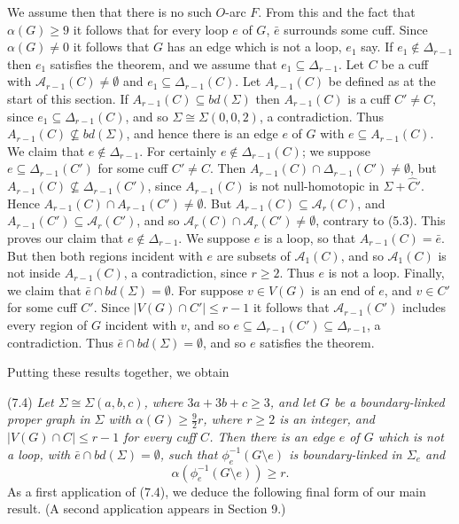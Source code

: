 We assume then that there is no such $O$-arc $F$. From this and the fact that $\alpha(G) \ge 9$ it follows that for every loop $e$ of $G$, $\bar{e}$ surrounds some cuff. Since $\alpha(G) \ne 0$ it follows that $G$ has an edge which is not a loop, $e_1$ say. If $e_1 \notin \Delta_{r-1}$ then $e_1$ satisfies the theorem, and we assume that $e_1 \subseteq \Delta_{r-1}$. Let $C$ be a cuff with $\mathscr{A}_{r-1}(C) \ne \emptyset$ and $e_1 \subseteq \Delta_{r-1}(C)$. Let $A_{r-1}(C)$ be defined as at the start of this section. If $A_{r-1}(C) \subseteq bd(\Sigma)$ then $A_{r-1}(C)$ is a cuff $C' \ne C$, since $e_1 \subseteq \Delta_{r-1}(C)$, and so $\Sigma \cong \Sigma(0, 0, 2)$, a contradiction. Thus $A_{r-1}(C) \nsubseteq bd(\Sigma)$, and hence there is an edge $e$ of $G$ with $e \subseteq A_{r-1}(C)$. We claim that $e \notin \Delta_{r-1}$. For certainly $e \notin \Delta_{r-1}(C)$; we suppose $e \subseteq \Delta_{r-1}(C')$ for some cuff $C' \ne C$. Then $A_{r-1}(C) \cap \Delta_{r-1}(C') \ne \emptyset$, but $A_{r-1}(C) \nsubseteq \Delta_{r-1}(C')$, since $A_{r-1}(C)$ is not null-homotopic in $\Sigma + \hat{C}'$. Hence $A_{r-1}(C) \cap A_{r-1}(C') \ne \emptyset$. But $A_{r-1}(C) \subseteq \mathscr{A}_r(C)$, and $A_{r-1}(C') \subseteq \mathscr{A}_r(C')$, and so $\mathscr{A}_r(C) \cap \mathscr{A}_r(C') \ne \emptyset$, contrary to (5.3). This proves our claim that $e \notin \Delta_{r-1}$. We suppose $e$ is a loop, so that $A_{r-1}(C) = \bar{e}$. But then both regions incident with $e$ are subsets of $\mathscr{A}_1(C)$, and so $\mathscr{A}_1(C)$ is not inside $A_{r-1}(C)$, a contradiction, since $r \ge 2$. Thus $e$ is not a loop. Finally, we claim that $\bar{e} \cap bd(\Sigma) = \emptyset$. For suppose $v \in V(G)$ is an end of $e$, and $v \in C'$ for some cuff $C'$. Since $|V(G) \cap C'| \le r-1$ it follows that $\mathscr{A}_{r-1}(C')$ includes every region of $G$ incident with $v$, and so $e \subseteq \Delta_{r-1}(C') \subseteq \Delta_{r-1}$, a contradiction. Thus $\bar{e} \cap bd(\Sigma) = \emptyset$, and so $e$ satisfies the theorem.

Putting these results together, we obtain

\stmt
(7.4) \textit{Let $\Sigma \cong \Sigma(a, b, c)$, where $3a + 3b + c \ge 3$, and let $G$ be a boundary-linked proper graph in $\Sigma$ with $\alpha(G) \ge \frac{9}{2}r$, where $r \ge 2$ is an integer, and $|V(G) \cap C| \le r-1$ for every cuff $C$. Then there is an edge $e$ of $G$ which is not a loop, with $\bar{e} \cap bd(\Sigma) = \emptyset$, such that $\phi_e^{-1}(G \setminus e)$ is boundary-linked in $\Sigma_e$ and}
\begin{equation*}
\alpha(\phi_e^{-1}(G \setminus e)) \ge r.
\end{equation*}
As a first application of (7.4), we deduce the following final form of our main result. (A second application appears in Section 9.)


